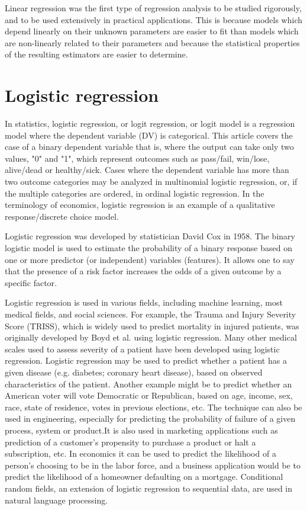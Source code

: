 \documentclass[sigconf]{acmart}
\begin{document}
Linear regression was the first type of regression analysis to be studied rigorously, and to be used extensively in practical applications. This is because models which depend linearly on their unknown parameters are easier to fit than models which are non-linearly related to their parameters and because the statistical properties of the resulting estimators are easier to determine\cite{C1}.

\section{Logistic regression}
\par In statistics, logistic regression, or logit regression, or logit model is a regression model where the dependent variable (DV) is categorical. This article covers the case of a binary dependent variable that is, where the output can take only two values, "0" and "1", which represent outcomes such as pass/fail, win/lose, alive/dead or healthy/sick. Cases where the dependent variable has more than two outcome categories may be analyzed in multinomial logistic regression, or, if the multiple categories are ordered, in ordinal logistic regression. In the terminology of economics, logistic regression is an example of a qualitative response/discrete choice model\cite{C2}.

Logistic regression was developed by statistician David Cox in 1958. The binary logistic model is used to estimate the probability of a binary response based on one or more predictor (or independent) variables (features). It allows one to say that the presence of a risk factor increases the odds of a given outcome by a specific factor\cite{C2}.

Logistic regression is used in various fields, including machine learning, most medical fields, and social sciences. For example, the Trauma and Injury Severity Score (TRISS), which is widely used to predict mortality in injured patients, was originally developed by Boyd et al. using logistic regression. Many other medical scales used to assess severity of a patient have been developed using logistic regression. Logistic regression may be used to predict whether a patient has a given disease (e.g. diabetes; coronary heart disease), based on observed characteristics of the patient. Another example might be to predict whether an American voter will vote Democratic or Republican, based on age, income, sex, race, state of residence, votes in previous elections, etc. The technique can also be used in engineering, especially for predicting the probability of failure of a given process, system or product.It is also used in marketing applications such as prediction of a customer's propensity to purchase a product or halt a subscription, etc. In economics it can be used to predict the likelihood of a person's choosing to be in the labor force, and a business application would be to predict the likelihood of a homeowner defaulting on a mortgage. Conditional random fields, an extension of logistic regression to sequential data, are used in natural language processing\cite{C2}.
\end{document}
